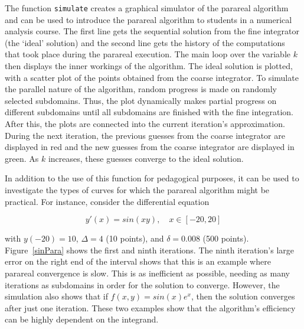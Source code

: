 \documentclass[12pt]{article}
\begin{document}
The function \texttt{simulate} creates a graphical simulator of the parareal
algorithm and can be used to introduce the parareal algorithm to students in a
numerical analysis course.  The first line gets the sequential solution from
the fine integrator (the `ideal' solution) and the second line gets the history
of the computations that took place during the parareal execution. The main
loop over the variable $k$ then displays the inner workings of the algorithm.
The ideal solution is plotted, with a scatter plot of the points obtained from
the coarse integrator. To simulate the parallel nature of the algorithm, random
progress is made on randomly selected subdomains. Thus, the plot dynamically
makes partial progress on different subdomains until all subdomains are
finished with the fine integration. After this, the plots are connected into
the current iteration's approximation. During the next iteration, the previous
guesses from the coarse integrator are displayed in red and the new guesses
from the coarse integrator are displayed in green. As $k$ increases, these
guesses converge to the ideal solution.

In addition to the use of this function for pedagogical purposes, it can be
used to investigate the types of curves for which the parareal algorithm might
be practical.  For instance, consider the differential equation

\begin{equation*} y'(x) = sin(xy), \quad x \in [-20,20] \end{equation*}

\noindent with $y(-20) = 10$, $\Delta = 4$ (10 points), and $\delta = 0.008$
(500 points).  Figure~\ref{sinPara} shows the first and ninth iterations.  The
ninth iteration's large error on the right end of the interval shows that this
is an example where parareal convergence is slow. This is as inefficient as
possible, needing as many iterations as subdomains in order for the solution to
converge.  However, the simulation also shows that if $f(x,y) = sin(x)e^x$,
then the solution converges after just one iteration.  These two examples show
that the algorithm's efficiency can be highly dependent on the integrand. 


 
\end{document}
